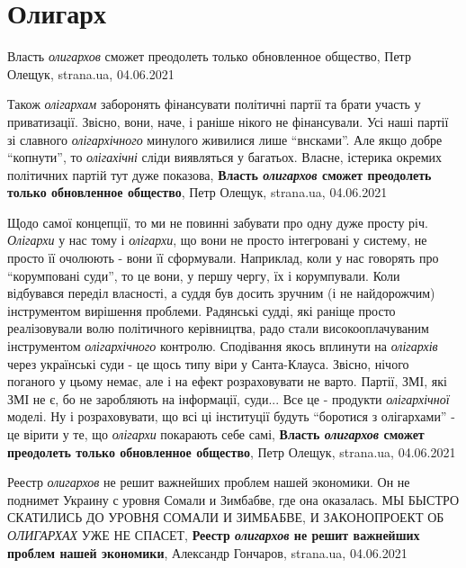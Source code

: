  
 
 
 
 
\chapter{Олигарх}
\label{sec:slova.oligarh}

Власть \emph{олигархов} сможет преодолеть только обновленное общество,
Петр Олещук, strana.ua, 04.06.2021

Також \emph{олігархам} заборонять фінансувати політичні партії та брати участь у
приватизації. Звісно, вони, наче, і раніше нікого не фінансували. Усі наші
партії зі славного \emph{олігархічного} минулого живилися лише \enquote{внсками}. Але якщо
добре \enquote{копнути}, то \emph{олігахічні} сліди виявляться у багатьох. Власне, істерика
окремих політичних партій тут дуже показова,
\textbf{Власть \emph{олигархов} сможет преодолеть только обновленное общество},
Петр Олещук, strana.ua, 04.06.2021

Щодо самої концепції, то ми не повинні забувати про одну дуже просту річ.
\emph{Олігархи} у нас тому і \emph{олігархи}, що вони не просто інтегровані у систему, не
просто її очолюють - вони її сформували. Наприклад, коли у нас говорять про
\enquote{корумповані суди}, то це вони, у першу чергу, їх і корумпували. Коли
відбувався переділ власності, а суддя був досить зручним (і не найдорожчим)
інструментом вирішення проблеми. Радянські судді, які раніще просто
реалізовували волю політичного керівництва, радо стали високооплачуваним
інструментом \emph{олігархічного} контролю.  Сподівання якось вплинути на \emph{олігархів}
через українські суди - це щось типу віри у Санта-Клауса. Звісно, нічого
поганого у цьому немає, але і на ефект розраховувати не варто. Партії, ЗМІ, які
ЗМІ не є, бо не заробляють на інформації, суди... Все це - продукти
\emph{олігархічної} моделі. Ну і розраховувати, що всі ці інституції будуть
\enquote{боротися з олігархами} - це вірити у те, що \emph{олігархи} покарають себе
самі,
\textbf{Власть \emph{олигархов} сможет преодолеть только обновленное общество},
Петр Олещук, strana.ua, 04.06.2021

Реестр \emph{олигархов} не решит важнейших проблем нашей экономики.  Он не
поднимет Украину с уровня Сомали и Зимбабве, где она оказалась.  МЫ БЫСТРО
СКАТИЛИСЬ ДО УРОВНЯ СОМАЛИ И ЗИМБАБВЕ, И ЗАКОНОПРОЕКТ ОБ \emph{ОЛИГАРХАХ} УЖЕ
НЕ СПАСЕТ,
\textbf{Реестр \emph{олигархов} не решит важнейших проблем нашей экономики},
Александр Гончаров, strana.ua, 04.06.2021

